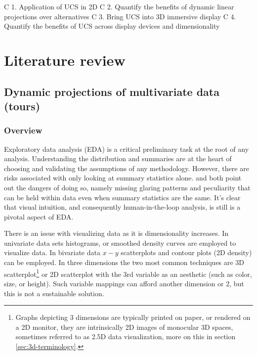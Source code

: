 \documentclass{monashthesis}
\begin{document}
C 1. Application of UCS in 2D C 2. Quantify the benefits of dynamic
linear projections over alternatives C 3. Bring UCS into 3D immersive
display C 4. Quantify the benefits of UCS across display devices and
dimensionality

\chapter{Literature review}\label{ch:lit_review}

\section{Dynamic projections of multivariate data
(tours)}\label{sec:tour}

\subsection{Overview}\label{overview}

Exploratory data analysis (EDA) is a critical preliminary task at the
root of any analysis. Understanding the distribution and summaries are
at the heart of choosing and validating the assumptions of any
methodology. However, there are risks associated with only looking at
summary statistics alone. \textcite{anscombe_graphs_1973} and
\textcite{matejka_same_2017} both point out the dangers of doing so,
namely missing glaring patterns and peculiarity that can be held within
data even when summary statistics are the same. It's clear that visual
intuition, and consequently human-in-the-loop analysis, is still is a
pivotal aspect of EDA.

There is an issue with visualizing data as it is dimensionality
increases. In univariate data sets histograms, or smoothed density
curves are employed to visualize data. In bivariate data \(x-y\)
scatterplots and contour plots (2D density) can be employed. In three
dimensions the two most common techniques are 3D
scatterplot\footnote{Graphs depicting 3 dimensions are typically printed on paper, or rendered on a 2D monitor, they are intrinsically 2D images of monocular 3D spaces, sometimes referred to as 2.5D data visualization, more on this in section \ref{sec:3d-terminology}.}
or 2D scatterplot with the 3rd variable as an aesthetic (such as color,
size, or height). Such variable mappings can afford another dimension or
2, but this is not a sustainable solution.
\end{document}
